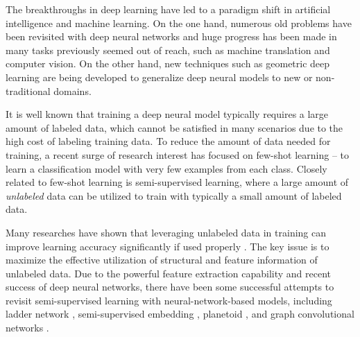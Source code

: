 \documentclass[letterpaper]{article} \usepackage{aaai18}  \usepackage{times}  \usepackage{helvet}  \usepackage{courier}  \usepackage{url}  \usepackage{graphicx}  \usepackage{algorithm}
\begin{document}
\noindent The breakthroughs in deep learning have led to a paradigm shift in artificial intelligence and machine learning. On the one hand, numerous old problems have been revisited with deep neural networks and
huge progress has been made in many tasks previously seemed out of reach, such as machine translation and computer vision. On the other hand, new techniques such as geometric deep learning \cite{bronstein2017geometric} are being developed to generalize deep neural models to new or non-traditional domains.

It is well known that training a deep neural model typically requires a large amount of labeled data, which cannot be satisfied in many scenarios due to the high cost of labeling training data. To reduce the amount of data needed for training, a recent surge of research interest has focused on few-shot learning \cite{lake2015human,rezende2016one} -- to learn a classification model with very few examples from each class. Closely related to few-shot learning is semi-supervised learning, where a large amount of \emph{unlabeled} data can be utilized to train with typically a small amount of labeled data.





Many researches have shown that leveraging unlabeled data in training can improve learning accuracy significantly if used properly \cite{zhu2009introduction}. The key issue is to maximize the effective utilization of structural and feature information of unlabeled data. Due to the powerful feature extraction capability and recent success of deep neural networks, there have been some successful attempts to revisit semi-supervised learning with neural-network-based models, including ladder network \cite{rasmus2015semi}, semi-supervised embedding \cite{weston2012deep}, planetoid \cite{yang2016revisiting}, and graph convolutional networks \cite{kipf2016semi}.
\end{document}

